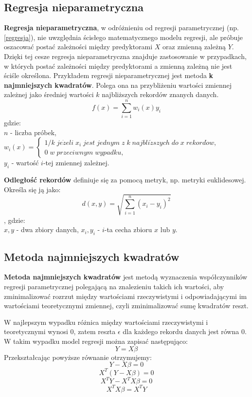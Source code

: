 \subsection{Regresja nieparametryczna}
\textbf{Regresja nieparametryczna}, w odróżnieniu od regresji parametrycznej (np. \ref{regresja}), nie uwzględnia ścisłego matematycznego modelu regresji, ale próbuje oszacować postać zależności między predyktorami \(X\) oraz zmienną zależną \(Y\). Dzięki tej cesze regresja nieparametryczna znajduje zastosowanie w przypadkach, w których postać zależności między predyktorami a zmienną zależną nie jest ściśle określona.\cite{nonparametricregression}
Przykładem regresji nieparametrycznej jest metoda \textbf{k najmniejszych kwadratów}. Polega ona na przybliżeniu wartości zmiennej zależnej jako średniej wartości \(k\) najbliższych rekordów znanych danych.
\[f(x)=\sum_{i = 1}^{n}w_i(x)y_i \]
gdzie:\\
\(n\) - liczba próbek,\\[10pt]
\(w_i(x) = \left\{\begin{array}{ll}
1/k\;je\dot{z}eli\;x_i\;jest\;jednym\;z\;k\;najbli\dot{z}szych\;do\;x\;rekord\dot{o}w,\\
0\;w\;przeciwnym\;wypadku,
\end{array}
\right. \)\\[10pt]
\(y_i\) - wartość \(i\)-tej zmiennej zależnej.\cite{ryantibshirani}

\textbf{Odległość rekordów} definiuje się za pomocą metryk, np. metryki euklidesowej. Określa się ją jako:
\[d(x,y)=\sqrt{\sum_{i=1}^{n}(x_i-y_i)^2} \],
gdzie:\\
\(x, y\) - dwa zbiory danych,
\(x_i, y_i\) - \(i\)-ta cecha zbioru \(x\) lub \(y\).\cite{rachelski}
\subsection{Metoda najmniejszych kwadratów}\label{najmniejsze_kwadraty}
\textbf{Metoda najmniejszych kwadratów} jest metodą wyznaczenia współczynników regresji parametrycznej polegającą na znalezieniu takich ich wartości, aby zminimalizować rozrzut między wartościami rzeczywistymi i odpowiadającymi im wartościami teoretycznymi zmiennej, czyli zminimalizować sumę kwadratów reszt.\cite{bptstatystyka}

W najlepszym wypadku różnica między wartościami rzeczywistymi i teoretycznymi wynosi 0, zatem reszta \(\epsilon\) dla każdego rekordu danych jest równa 0. W takim wypadku model regresji można zapisać następująco: 
\[Y = X\beta\]
Przekształcając powyższe równanie otrzymujemy:
\[Y - X\beta = 0\]
\[X^T(Y - X\beta) = 0 \]
\[X^TY - X^TX\beta = 0 \]
\[X^TX\beta = X^TY\]

